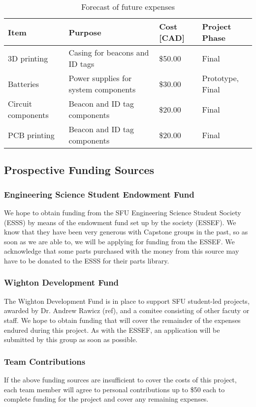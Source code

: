 \begin{table}[H]
\centering
\begin{tabular}{ | m{3.5cm} | m{6.25cm} | m{2.5cm} | m{3cm} |}
\hline
\textbf{Item} & \textbf{Purpose} & \textbf{Cost [CAD]} & \textbf{Project Phase}  \\
\hline
3D printing & Casing for beacons and ID tags & \$50.00 & Final  \\
\hline
Batteries & Power supplies for system components & \$30.00 & Prototype, Final \\
\hline
Circuit components & Beacon and ID tag components & \$20.00 & Final \\
\hline
PCB printing & Beacon and ID tag components & \$20.00 & Final \\
\hline
\end{tabular}
\caption{Forecast of future expenses}
\end{table}

\pagebreak

\subsection{Prospective Funding Sources}
\subsubsection{Engineering Science Student Endowment Fund}
We hope to obtain funding from the SFU Engineering Science Student Society (ESSS) by means of the endowment fund set up by the society (ESSEF). We know that they have been very generous with Capstone groups in the past, so as soon as we are able to, we will be applying for funding from the ESSEF. We acknowledge that some parts purchased with the money from this source may have to be donated to the ESSS for their parts library.

\subsubsection{Wighton Development Fund}
The Wighton Development Fund is in place to support SFU student-led projects, awarded by Dr. Andrew Rawicz (ref), and a comitee consisting of other facuty or staff. We hope to obtain funding that will cover the remainder of the expenses endured during this project. As with the ESSEF, an application will be submitted by this group as soon as possible.

\subsubsection{Team Contributions}
If the above funding sources are insufficient to cover the costs of this project, each team member will agree to personal contributions up to \$50 each to complete funding for the project and cover any remaining expenses.




